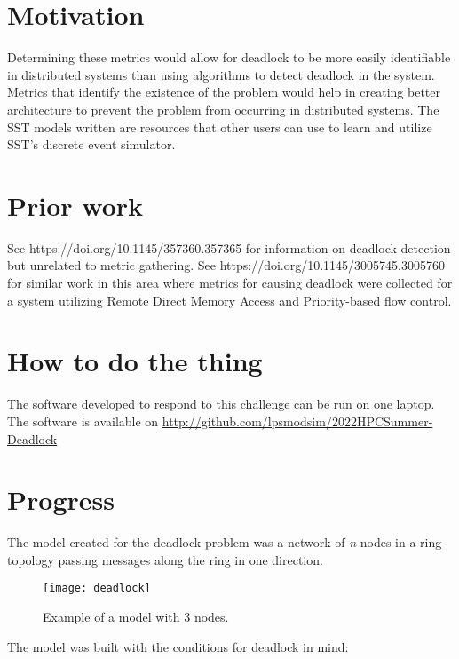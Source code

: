 \documentclass{article}
\begin{document}
\section{Motivation} %

Determining these metrics would allow for deadlock to be more easily identifiable in distributed systems than using algorithms to detect deadlock in the system. Metrics that identify the existence of the problem would help in creating better architecture to prevent the problem from occurring in distributed systems. The SST models written are resources that other users can use to learn and utilize SST's discrete event simulator.

\section{Prior work} %

See https://doi.org/10.1145/357360.357365 for information on deadlock detection but unrelated to metric gathering.
See https://doi.org/10.1145/3005745.3005760 for similar work in this area where metrics for causing deadlock were collected for a system utilizing Remote Direct Memory Access and Priority-based flow control.

\section{How to do the thing}

The software developed to respond to this challenge can be run on one laptop.
The software is available on \href{http://github.com/lpsmodsim/2022HPCSummer-Deadlock}{http://github.com/lpsmodsim/2022HPCSummer-Deadlock}

\section{Progress}
The model created for the deadlock problem was a network of \textit{n} nodes in a ring topology passing messages along the ring in one direction.

\begin{figure}[H]
\texttt{[image: deadlock]}\newline
\centering
\caption{Example of a model with 3 nodes.}
\centering
\end{figure}

The model was built with the conditions for deadlock in mind:
\end{document}
